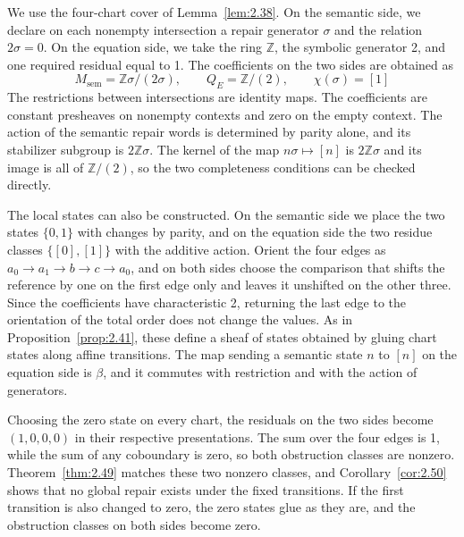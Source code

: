 \begin{example}\label{ex:2.51}

We use the four-chart cover of Lemma~\ref{lem:2.38}. On the semantic side, we declare on
each nonempty intersection a repair generator $\sigma$ and the relation $2\sigma=0$. On
the equation side, we take the ring $\mathbb{Z}$, the symbolic generator 2, and one
required residual equal to 1. The coefficients on the two sides are obtained as
\begin{equation*}
M_{\mathrm{sem}}=\mathbb{Z}\sigma/(2\sigma),
\qquad Q_E=\mathbb{Z}/(2),
\qquad\chi(\sigma)=[1]
\tag{2.39}\label{eq:2.39}
\end{equation*}
The restrictions between intersections are identity maps. The coefficients are constant
presheaves on nonempty contexts and zero on the empty context. The action of the
semantic repair words is determined by parity alone, and its stabilizer subgroup is
$2\mathbb{Z}\sigma$. The kernel of the map $n\sigma\mapsto[n]$ is $2\mathbb{Z}\sigma$
and its image is all of $\mathbb{Z}/(2)$, so the two completeness conditions can be
checked directly.

The local states can also be constructed. On the semantic side we place the two states
$\{0,1\}$ with changes by parity, and on the equation side the two residue classes
$\{[0],[1]\}$ with the additive action. Orient the four edges as
$a_0\to a_1\to b\to c\to a_0$, and on both sides choose the comparison that shifts the
reference by one on the first edge only and leaves it unshifted on the other three.
Since the coefficients have characteristic 2, returning the last edge to the
orientation of the total order does not change the values. As in
Proposition~\ref{prop:2.41}, these define a sheaf of states obtained by gluing chart
states along affine transitions. The map sending a semantic state $n$ to $[n]$ on the
equation side is $\beta$, and it commutes with restriction and with the action of
generators.

Choosing the zero state on every chart, the residuals on the two sides become
$(1,0,0,0)$ in their respective presentations. The sum over the four edges is 1, while
the sum of any coboundary is zero, so both obstruction classes are nonzero.
Theorem~\ref{thm:2.49} matches these two nonzero classes, and Corollary~\ref{cor:2.50}
shows that no global repair exists under the fixed transitions. If the first transition
is also changed to zero, the zero states glue as they are, and the obstruction classes
on both sides become zero.

\end{example}

